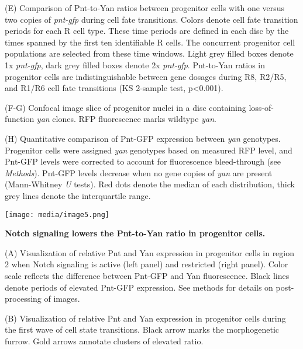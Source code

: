 (E) Comparison of Pnt-to-Yan ratios between progenitor cells with one versus two copies of \emph{pnt-gfp} during cell fate transitions. Colors denote cell fate transition periods for each R cell type. These time periods are defined in each disc by the times spanned by the first ten identifiable R cells. The concurrent progenitor cell populations are selected from these time windows. Light grey filled boxes denote 1x \emph{pnt-gfp}, dark grey filled boxes denote 2x \emph{pnt-gfp}. Pnt-to-Yan ratios in progenitor cells are indistinguishable between gene dosages during R8, R2/R5, and R1/R6 cell fate transitions (KS 2-sample test, p\textless{}0.001).

(F-G) Confocal image slice of progenitor nuclei in a disc containing loss-of-function \emph{yan} clones. RFP fluorescence marks wildtype \emph{yan}.

(H) Quantitative comparison of Pnt-GFP expression between \emph{yan} genotypes. Progenitor cells were assigned \emph{yan} genotypes based on measured RFP level, and Pnt-GFP levels were corrected to account for fluorescence bleed-through (see \emph{Methods}). Pnt-GFP levels decrease when no gene copies of \emph{yan} are present (Mann-Whitney \emph{U} tests). Red dots denote the median of each distribution, thick grey lines denote the interquartile range.

\texttt{[image: media/image5.png]}

\textbf{Notch signaling lowers the Pnt-to-Yan ratio in progenitor} \textbf{cells.}

(A) Visualization of relative Pnt and Yan expression in progenitor cells in region 2 when Notch signaling is active (left panel) and restricted (right panel). Color scale reflects the difference between Pnt-GFP and Yan fluorescence. Black lines denote periods of elevated Pnt-GFP expression. See methods for details on post-processing of images.

(B) Visualization of relative Pnt and Yan expression in progenitor cells during the first wave of cell state transitions. Black arrow marks the morphogenetic furrow. Gold arrows annotate clusters of elevated ratio.

